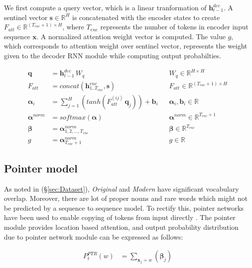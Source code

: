 We first compute a query vector, which is a linear tranformation of $\mathbf{h}_{t-1}^{dec}$. A sentinel vector $\mathbf{s} \in \mathbb{R}^H$ is concatenated with the encoder states to create $F_{att} \in \mathbb{R} ^ { (T_{enc}+1) \times H } $, where $T_{enc}$ represents the number of tokens in encoder input sequence $\mathbf{x}$. A normalized attention weight vector is computed. The value $g$, which corresponds to attention weight over sentinel vector, represents the weight given to the decoder RNN module while computing output probabilties.
\begin{center}
\footnotesize
\begin{align*}
  \mathbf{q} &= \mathbf{h}_{t-1}^{dec} \,W_{q}   &&  W_{q} \in \mathbb{R}^{H \times H} \\
  F_{att} &= concat( \mathbf{h}^{enc}_{1..T_{enc}}, \mathbf{s} )   && F_{att} \in \mathbb{R}^{(T_{enc}+1) \times H} \\
  \boldsymbol{\alpha}_i &= \sum_{j=1}^{H}( tanh(F_{att}^{(ij)} \, \mathbf{q}_j) ) + \mathbf{b}_i   && \boldsymbol{\alpha}_i, \mathbf{b}_i \in \mathbb{R} \\
  \boldsymbol{\alpha}^{norm} &= softmax(\boldsymbol{\alpha}) && \boldsymbol{\alpha}^{norm} \in \mathbb{R}^{T_{enc}+1} \\
  \boldsymbol{\beta} &= \boldsymbol{\alpha}^{norm}_{1,2,...,T_{enc}} && \boldsymbol{\beta} \in \mathbb{R}^{T_{enc}} \\
  g &= \boldsymbol{\alpha}^{norm}_{T_{enc}+1} && g \in \mathbb{R}
\end{align*}
\normalsize
\end{center}



\subsection{Pointer model}

As noted in (\S \ref{sec:Dataset}), \textit{Original} and \textit{Modern} have significant vocabulary overlap. Moreover, there are lot of proper nouns and rare words which might not be predicted by a sequence to sequence model. To rectify this, pointer networks have been used to enable copying of tokens from input directly \cite{merity2016pointer}. The pointer module provides location based attention, and output probability distribution due to pointer network module can be expressed as follows:
\begin{center}
\footnotesize
\begin{align*}
P_{t}^{PTR}(w) &= \sum_{\mathbf{x}_j=w}( \boldsymbol{\beta}_j )
\end{align*}
\normalsize
\end{center}


